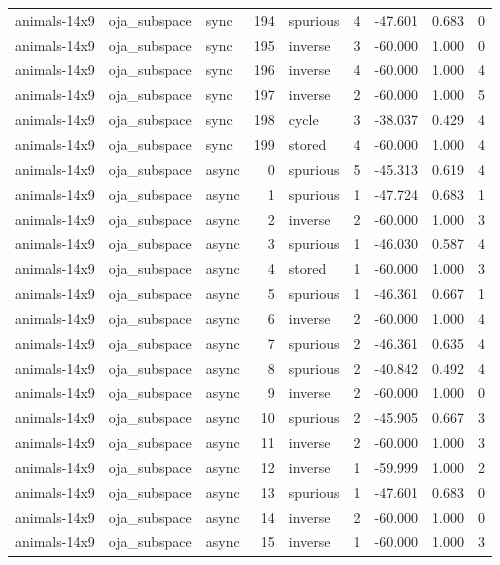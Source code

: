 \begin{tabular}{lllrlrrrr}
animals-14x9 & oja\_subspace & sync & 194 & spurious & 4 & -47.601 & 0.683 & 0 \\
animals-14x9 & oja\_subspace & sync & 195 & inverse & 3 & -60.000 & 1.000 & 0 \\
animals-14x9 & oja\_subspace & sync & 196 & inverse & 4 & -60.000 & 1.000 & 4 \\
animals-14x9 & oja\_subspace & sync & 197 & inverse & 2 & -60.000 & 1.000 & 5 \\
animals-14x9 & oja\_subspace & sync & 198 & cycle & 3 & -38.037 & 0.429 & 4 \\
animals-14x9 & oja\_subspace & sync & 199 & stored & 4 & -60.000 & 1.000 & 4 \\
animals-14x9 & oja\_subspace & async & 0 & spurious & 5 & -45.313 & 0.619 & 4 \\
animals-14x9 & oja\_subspace & async & 1 & spurious & 1 & -47.724 & 0.683 & 1 \\
animals-14x9 & oja\_subspace & async & 2 & inverse & 2 & -60.000 & 1.000 & 3 \\
animals-14x9 & oja\_subspace & async & 3 & spurious & 1 & -46.030 & 0.587 & 4 \\
animals-14x9 & oja\_subspace & async & 4 & stored & 1 & -60.000 & 1.000 & 3 \\
animals-14x9 & oja\_subspace & async & 5 & spurious & 1 & -46.361 & 0.667 & 1 \\
animals-14x9 & oja\_subspace & async & 6 & inverse & 2 & -60.000 & 1.000 & 4 \\
animals-14x9 & oja\_subspace & async & 7 & spurious & 2 & -46.361 & 0.635 & 4 \\
animals-14x9 & oja\_subspace & async & 8 & spurious & 2 & -40.842 & 0.492 & 4 \\
animals-14x9 & oja\_subspace & async & 9 & inverse & 2 & -60.000 & 1.000 & 0 \\
animals-14x9 & oja\_subspace & async & 10 & spurious & 2 & -45.905 & 0.667 & 3 \\
animals-14x9 & oja\_subspace & async & 11 & inverse & 2 & -60.000 & 1.000 & 3 \\
animals-14x9 & oja\_subspace & async & 12 & inverse & 1 & -59.999 & 1.000 & 2 \\
animals-14x9 & oja\_subspace & async & 13 & spurious & 1 & -47.601 & 0.683 & 0 \\
animals-14x9 & oja\_subspace & async & 14 & inverse & 2 & -60.000 & 1.000 & 0 \\
animals-14x9 & oja\_subspace & async & 15 & inverse & 1 & -60.000 & 1.000 & 3 \\

\end{tabular}
